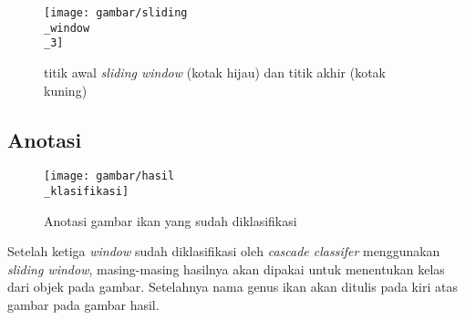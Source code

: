 \begin{figure}[H]
  \centering{}
	\texttt{[image: gambar/sliding\\\_window\\\_3]}
  \caption{titik awal \textit{sliding window} (kotak hijau) dan titik akhir (kotak kuning)}
\end{figure}

\subsection{Anotasi}

\begin{figure}[H]
  \centering{}
	\texttt{[image: gambar/hasil\\\_klasifikasi]}
  \caption{Anotasi gambar ikan yang sudah diklasifikasi}
\end{figure}

Setelah ketiga \textit{window} sudah diklasifikasi oleh \emph{cascade classifer} 
menggunakan \textit{sliding window}, masing-masing hasilnya akan dipakai 
untuk menentukan kelas dari objek pada gambar. Setelahnya nama 
genus ikan akan ditulis pada kiri atas gambar pada gambar hasil.


